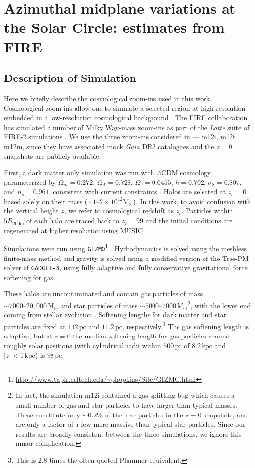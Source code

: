 \documentclass[twocolumn]{aastex62}
\newcommand{\Msun}{\text{M}_\odot}
\newcommand{\pc}{\text{pc}}
\newcommand{\kpc}{\text{kpc}}
\newcommand{\abs}[1]{\left| #1 \right|}
\newcommand{\z}{z_r}
\begin{document}
\section{Azimuthal midplane variations at the Solar Circle: estimates from FIRE} \label{sec:local_fire}
\subsection{Description of Simulation} \label{ssec:cosmozoom}
Here we briefly describe the cosmological zoom-ins used in this work.
Cosmological zoom-ins allow one to simulate a selected region at high
resolution embedded in a low-resolution cosmological background
\citep[e.g.][]{1993ApJ...412..455K,2014MNRAS.437.1894O}. The FIRE
collaboration has simulated a number of Milky Way-mass zoom-ins as part of the
{\em Latte} suite of FIRE-2 simulations
\citep{2016ApJ...827L..23W,2018MNRAS.481.4133G}. We use the three zoom-ins
considered in \citet{2018arXiv180610564S} --- m12i, m12f, m12m, since they
have associated mock {\em Gaia} DR2 catalogues and the $z=0$ snapshots are
publicly available.

First, a dark matter only simulation was run with $\Lambda$CDM cosmology
parameterized by $\Omega_m = 0.272$, $\Omega_{\Lambda} = 0.728$, $\Omega_b =
0.0455$, $h = 0.702$, $\sigma_8 = 0.807$, and $n_s = 0.961$, consistent with
current constraints \citep{2018arXiv180706209P}. Halos are selected at $\z=0$
based solely on their mass ($\sim 1\text{--}2 \times 10^{12} \Msun$). In this
work, to avoid confusion with the vertical height $z$, we refer to
cosmological redshift as $\z$. Particles within $5 R_{200\text{m}}$ of each
halo are traced back to $\z=99$ and the initial conditions are regenerated at
higher resolution using MUSIC \citep{2011MNRAS.415.2101H}.

Simulations were run using
\texttt{GIZMO}\footnote{\url{http://www.tapir.caltech.edu/~phopkins/Site/GIZMO.html}}
\citep{2015MNRAS.450...53H}. Hydrodynamics is solved using the meshless
finite-mass method and gravity is solved using a modified version of the
Tree-PM solver of \texttt{GADGET-3}, using fully adaptive and fully
conservative gravitational force softening for gas.

These halos are uncontaminated and contain gas particles of mass $\sim 7000
\text{--} 20,000\,\Msun$ and star particles of mass $\sim 5000 \text{--} 7000\,
\Msun$\footnote{In fact, the simulation m12i contained a gas
splitting bug which causes a small number of gas and star particles to have
larger than typical masses. These constitute only $\sim0.2\%$ of the star
particles in the $z=0$ snapshots, and are only a factor of a few more massive
than typical star particles. Since our results are broadly consistent between
the three simulations, we ignore this minor complication.}, with the lower end
coming from stellar evolution \citep{2018arXiv180610564S}. Softening lengths
for dark matter and star particles are fixed at $112\,\pc$ and $11.2\,\pc$,
respectively.\footnote{This is $2.8$ times the often-quoted
Plummer-equivalent.} The gas softening length is adaptive, but at $z=0$ the
median softening length for gas particles around roughly solar positions (with
cylindrical radii within $500\,\pc$ of $8.2\,\kpc$ and $\abs{z}<1\,\kpc$) is
$98\,\pc$.
\end{document}
